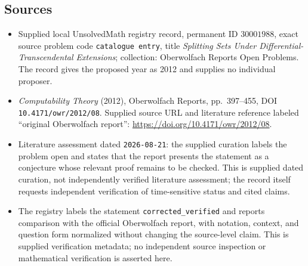 \documentclass[11pt]{article}
\begin{document}
\subsection{Sources}
\begin{itemize}
\item Supplied local UnsolvedMath registry record, permanent ID \(30001988\), exact source problem code \texttt{catalogue entry}, title \emph{Splitting Sets Under Differential-Transcendental Extensions}; collection: Oberwolfach Reports Open Problems. The record gives the proposed year as 2012 and supplies no individual proposer.
\item \emph{Computability Theory} (2012), Oberwolfach Reports, pp.\ 397--455, DOI \texttt{10.4171/owr/2012/08}. Supplied source URL and literature reference labeled ``original Oberwolfach report'': \url{https://doi.org/10.4171/owr/2012/08}.
\item Literature assessment dated \texttt{2026-08-21}: the supplied curation labels the problem open and states that the report presents the statement as a conjecture whose relevant proof remains to be checked. This is supplied dated curation, not independently verified literature assessment; the record itself requests independent verification of time-sensitive status and cited claims.
\item The registry labels the statement \texttt{corrected\_verified} and reports comparison with the official Oberwolfach report, with notation, context, and question form normalized without changing the source-level claim. This is supplied verification metadata; no independent source inspection or mathematical verification is asserted here.
\end{itemize}
\end{document}

